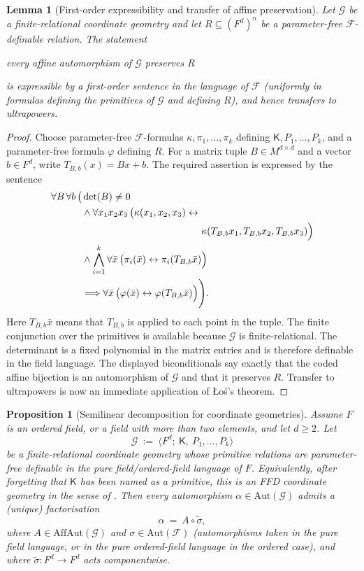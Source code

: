 \documentclass[11pt,a4paper]{article}
\newcommand{\G}{\mathcal{G}}
\newcommand{\F}{\mathcal{F}}
\newtheorem{lemma}[theorem]{Lemma}
\newtheorem{proposition}[theorem]{Proposition}
\theoremstyle{definition}
\begin{document}
\begin{lemma}[First-order expressibility and transfer of affine
preservation]
\label{lem:4.3}
Let $\G$ be a finite-relational coordinate geometry and
let $R\subseteq (F^d)^n$ be a parameter-free $\F$-definable
relation. The statement
\begin{center}
\emph{every affine automorphism of $\G$ preserves $R$}
\end{center}
is expressible by a first-order sentence in the language of
$\F$ (uniformly in formulas defining the primitives of $\G$
and defining $R$), and hence transfers to ultrapowers.
\end{lemma}
\begin{proof}
	Choose parameter-free $\F$-formulas
$\kappa,\pi_1,\dots,\pi_k$ defining $\mathsf K,P_1,\dots,P_k$, and a
parameter-free formula $\varphi$ defining $R$. For a matrix tuple
$B\in M^{d\times d}$ and a vector $b\in F^d$, write
$T_{B,b}(x)=Bx+b$. The required assertion is expressed by the sentence
\[
\begin{aligned}
\forall B\,\forall b\,\big(&\det(B)\neq 0 \\
&{}\wedge \forall x_1x_2x_3\,
 \big(\kappa(x_1,x_2,x_3)\leftrightarrow \\
&\hspace{43mm}
 \kappa(T_{B,b}x_1,T_{B,b}x_2,T_{B,b}x_3)\Big) \\
&{}\wedge \bigwedge_{i=1}^k \forall \bar x\,
 \big(\pi_i(\bar x)\leftrightarrow\pi_i(T_{B,b}\bar x)\Big) \\
&{}\Longrightarrow \forall \bar x\,
 \big(\varphi(\bar x)\leftrightarrow
 \varphi(T_{B,b}\bar x)\Big)\Bigg).
\end{aligned}
\] Here $T_{B,b}\bar x$ means that $T_{B,b}$ is applied to each
point in the tuple. The finite conjunction over the primitives is
available because $\G$ is finite-relational. The determinant is a fixed
polynomial in the matrix entries and is therefore definable in the field
language. The displayed biconditionals say exactly that the coded affine
bijection is an automorphism of $\G$ and that it preserves $R$.
Transfer to ultrapowers is now an immediate application of Łoś's
theorem.
\end{proof}


\begin{proposition}[Semilinear decomposition for coordinate geometries]
	\label{prop:4.4}
Assume $F$ is an ordered
field, or a field with more than two elements, and let $d\ge 2$. Let \[
\G\ :=\ \langle F^d;\ \mathsf K,\ P_1,\dots,P_k\rangle
\] be a finite-relational coordinate geometry whose primitive relations
are parameter-free definable in the pure field/ordered-field language of
$F$. Equivalently, after forgetting that $\mathsf K$ has been named
as a primitive, this is an FFD coordinate geometry in the
sense of \cite{MSS26}. Then every automorphism
$\alpha\in\mathrm{Aut}(\G)$ admits a (unique) factorisation \[
\alpha\ =\ A\circ \widetilde\sigma,
\] where $A\in\mathrm{AffAut}(\G)$ and $\sigma\in\mathrm{Aut}(\F)$
(automorphisms taken in the pure field language, or in the pure
ordered-field language in the ordered case), and where
$\widetilde\sigma:F^d\to F^d$ acts componentwise.
\end{proposition}
\end{document}
